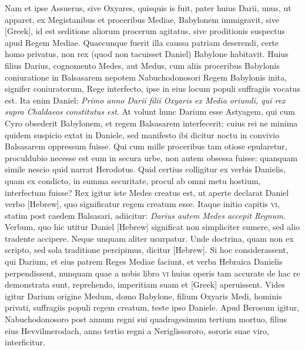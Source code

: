 Nam et ipse Assuerus,
sive Oxyares, quisquis is fuit, pater huius Darii, unus, ut apparet,
ex Megistanibus et proceribus Mediae, Babylonem immigravit,
sive \textgreek{[Greek]}, id est seditione aliorum procerum agitatus,
sive proditionis suspectus apud Regem Mediae.
Quaecunque fuerit
illa caussa patriam deserendi, certe homo privatus, non rex
(quod non tacuisset Daniel) Babylone habitavit.
Huius filius Darius,
cognomento Medes, aut Medus, cum aliis proceribus Babylonis
coniuratione in Balsasarem nepotem Nabuchodonosori Regem
Babylonis inita, signifer coniuratorum, Rege interfecto, ipse
in eius locum populi suffragiis vocatus est.
Ita enim Daniel: \textit{Primo
anno Darii filii Oxyaris ex Media oriundi, qui rex supra Chaldaeos
constitutus est}.
At volunt hunc Darium esse Astyagem, qui cum
Cyro obsederit Babylonem, et regem Balsasarem interfecerit: cuius
rei ne minima quidem suspicio extat in Daniele, sed manifesto
ibi dicitur noctu in convivio Balsasarem oppressum fuisse.
Qui
cum mille proceribus tam otiose epularetur, proculdubio necesse
est eum in secura urbe, non autem obsessa fuisse: quanquam simile
nescio quid narrat Herodotus.
Quid certius colligitur ex verbis
Danielis, quam ex condicto, in summa securitate, procul ab omni
metu hostium, interfectum fuisse?
Rex igitur iste Medes creatus
est, ut aperte declarat Daniel verbo
 \texthebrew{[Hebrew]}, quo significatur regem
creatum esse.
Itaque initio capitis \textsc{vi}, statim post caedem Balsasari,
adiicitur: \textit{Darius autem Medes accepit Regnum}.
Verbum,
quo hic utitur Daniel \texthebrew{[Hebrew]}
 significat non simpliciter sumere, sed
alio tradente accipere.
Neque unquam aliter usurpatur.
Unde doctrina,
quam non ex scripto, sed sola traditione percipimus, dicitur
\texthebrew{[Hebrew]}.
Si hoc considerassent, qui Darium, et eius patrem Reges
Mediae faciunt, et verba Hebraica Danielis perpendissent,
nunquam quae a nobis libro \textsc{vi} huius operis tam accurate de hac
re demonstrata sunt, reprehendo, imperitiam suam et \textgreek{[Greek]}
aperuissent.
Vides igitur Darium origine Medum, domo Babylone,
filium Oxyaris Medi, hominis privati, suffragiis populi regem
creatum, teste ipso Daniele.
Apud Berosum igitur, Nabuchodonosoro
post annum regni sui quadragesimum tertium mortuo, filius
eius Hevvilmerodach, anno tertio regni a Neriglissororo, sororis
suae viro, interficitur.

